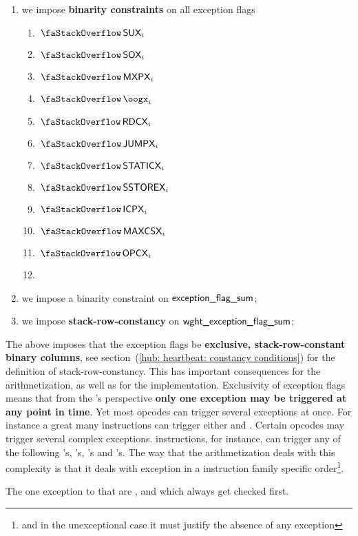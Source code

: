 \begin{enumerate}
	\item we impose \textbf{binarity constraints} on all exception flags
		\begin{multicols}{4}
			\begin{enumerate}
				\item $\stackSux     _{i}$
				\item $\stackSox     _{i}$
				\item $\stackMxpx    _{i}$
				\item $\stackOogx    _{i}$
				\item $\stackRdcx    _{i}$
				\item $\stackJumpx   _{i}$
				\item $\stackStaticx _{i}$
				\item $\stackSstorex _{i}$
				\item $\stackIcpx    _{i}$
				\item $\stackMaxcsx  _{i}$
				\item $\stackOpcx    _{i}$
				\item[\vspace{\fill}]
			\end{enumerate}
		\end{multicols}
        \item we impose a binarity constraint on $\textsf{exception\_flag\_sum}$;
	\item we impose \textbf{stack-row-constancy} on $\textsf{wght\_}\textsf{exception\_flag\_sum}$;
\end{enumerate}

\saNote{} \label{hub: generalities: exceptions: the stack's exception are exclusive binary flags}
The above imposes that the exception flags be \textbf{exclusive, stack-row-constant binary columns}, see section~(\ref{hub: heartbeat: constancy conditions}) for the definition of stack-row-constancy.
This has important consequences for the arithmetization, as well as for the implementation.
Exclusivity of exception flags means that from the \zkEvm{}'s perspective \textbf{only one exception may be triggered at any point in time}.
Yet most \evm{} opcodes can trigger several exceptions at once.
For instance a great many instructions can trigger either \suxSH{} and \oogxSH{}.
Certain opcodes may trigger several complex exceptions.
 instructions, for instance, can trigger any of the following
\suxSH's,
\staticxSH's,
\mxpxSH's and
\oogxSH's.
The way that the arithmetization deals with this complexity is that it deals with exception in a instruction family specific order\footnote{and in the unexceptional case it must justify the absence of any exception}.

\saNote{} The one exception to that are \opcxSH{}, \suxSH{} and \soxSH{} which always get checked first.
